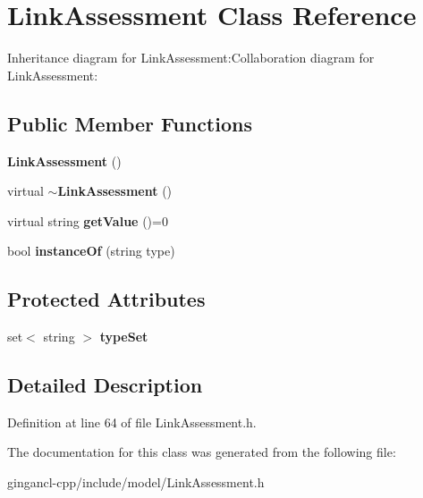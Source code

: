 \section{LinkAssessment Class Reference}
\label{classbr_1_1pucrio_1_1telemidia_1_1ginga_1_1ncl_1_1model_1_1link_1_1LinkAssessment}
Inheritance diagram for LinkAssessment:Collaboration diagram for LinkAssessment:\subsection*{Public Member Functions}
\begin{CompactItemize}
\item 
{\bf LinkAssessment} ()\label{classbr_1_1pucrio_1_1telemidia_1_1ginga_1_1ncl_1_1model_1_1link_1_1LinkAssessment_59a2d8b65a5af97491fd038ba3897b4b}

\item 
virtual {\bf $\sim$LinkAssessment} ()\label{classbr_1_1pucrio_1_1telemidia_1_1ginga_1_1ncl_1_1model_1_1link_1_1LinkAssessment_0408ef884139f4cacfa54664ad82cb7e}

\item 
virtual string \textbf{getValue} ()=0\label{classbr_1_1pucrio_1_1telemidia_1_1ginga_1_1ncl_1_1model_1_1link_1_1LinkAssessment_4d1efb9fd92b14fd14a880ce3bc17701}

\item 
bool {\bf instanceOf} (string type)\label{classbr_1_1pucrio_1_1telemidia_1_1ginga_1_1ncl_1_1model_1_1link_1_1LinkAssessment_14ad38e2ebb90e32415e1fc2be74e63a}

\end{CompactItemize}
\subsection*{Protected Attributes}
\begin{CompactItemize}
\item 
set$<$ string $>$ {\bf typeSet}\label{classbr_1_1pucrio_1_1telemidia_1_1ginga_1_1ncl_1_1model_1_1link_1_1LinkAssessment_145b3afaa194308141d367cc1393d565}

\end{CompactItemize}


\subsection{Detailed Description}




Definition at line 64 of file LinkAssessment.h.

The documentation for this class was generated from the following file:\begin{CompactItemize}
\item 
gingancl-cpp/include/model/LinkAssessment.h\end{CompactItemize}
